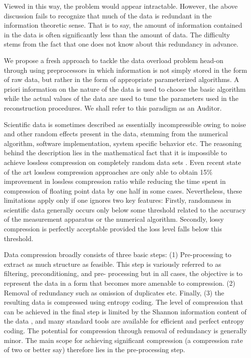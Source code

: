 Viewed in this way, the problem would appear intractable. However, the above
discussion fails to recognize that much of the data is redundant in the
information theoretic sense.  That is to say, the amount of information
contained in the data is often significantly less than the amount of data.  The
difficulty stems from the fact that one does not know about this redundancy in
advance. 


We propose a fresh approach to tackle the data overload problem head-on through
using preprocessors in which information is not simply stored in the form of
raw data, but rather in the form of appropriate parameterized algorithms. A
priori information on the nature of the data is used to choose the basic
algorithm while the actual values of the data are used to tune the parameters
used in the reconstruction procedures. We shall refer to this paradigm as an
Auditor.

Scientific data is sometimes described as essentially incompressible owing to
noise and other random effects present in the data, stemming from the numerical
algorithm, software implementation, system specific behavior etc. The reasoning
behind the description lies in the mathematical fact that it is impossible to
achieve lossless compression on completely random data sets \cite{Gray:book}. Even
recent state of the art lossless compression approaches \cite{GomezCappello} are only
able to obtain 15\% improvement in lossless compression ratio while reducing
the time spent in compression of floating point data by one half in some cases.
Nevertheless, these limitations apply only if one ignores two key features:
Firstly, randomness in scientific data generally occurs only below some
threshold related to the accuracy of the measurement apparatus or the numerical
algorithm. Secondly, lossy compression is perfectly acceptable provided the
loss level falls below this threshold.

Data compression broadly consists of three basic steps: (1) Pre-processing to
extract as much structure as feasible. This step is variously referred to as
filtering, preconditioning, and pre- processing but in all cases, the objective
is to represent the data in a form that becomes more amenable to compression.
(2) Removal of redundancy such as omission of duplicates etc.  Finally, (3) the
resulting data is compressed using entropy coding. The level of compression
that can be achieved in the final step is limited by the Shannon information
content of the data \cite{Gray:book}, and many standard tools are available for
efficient and perfect entropy coding. The potential for compression through
removal of redundancy is generally minor. The main scope for achieving
significant compression (a compression rate of two or better say) therefore
lies in the pre-processing step.

